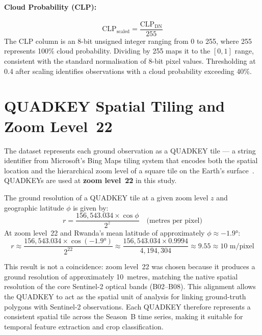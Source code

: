 \paragraph{Cloud Probability (CLP):}
\begin{equation}
\label{eq:clp_scale}
\mathrm{CLP}_{\text{scaled}} = \frac{\mathrm{CLP}_{\text{DN}}}{255}
\end{equation}
The CLP column is an 8-bit unsigned integer ranging from 0 to 255,
where 255 represents 100\% cloud probability. Dividing by 255 maps it to
the $[0,1]$ range, consistent with the standard normalisation of 8-bit
pixel values. Thresholding at 0.4 after scaling identifies observations
with a cloud probability exceeding 40\%.


\section{QUADKEY Spatial Tiling and Zoom Level~22}
\label{sec:quadkey}

The dataset represents each ground observation as a QUADKEY tile — a
string identifier from Microsoft's Bing Maps tiling system that encodes
both the spatial location and the hierarchical zoom level of a square
tile on the Earth's surface~\cite{bing2010}. QUADKEYs are used at
\textbf{zoom level~22} in this study.

The ground resolution of a QUADKEY tile at a given zoom level $z$ and
geographic latitude $\phi$ is given by:
\begin{equation}
\label{eq:ground_res}
r = \frac{156{,}543.034 \times \cos\phi}{2^{z}} \quad \text{(metres per pixel)}
\end{equation}
At zoom level~22 and Rwanda's mean latitude of approximately $\phi \approx
-1.9°$:
\begin{equation}
r \approx \frac{156{,}543.034 \times \cos(-1.9°)}{2^{22}}
  \approx \frac{156{,}543.034 \times 0.9994}{4{,}194{,}304}
  \approx 9.55 \approx 10 \text{ m/pixel}
\end{equation}

This result is not a coincidence: zoom level~22 was chosen because it
produces a ground resolution of approximately 10~metres, matching the
native spatial resolution of the core Sentinel-2 optical bands
(B02--B08). This alignment allows the QUADKEY to act as the spatial unit
of analysis for linking ground-truth polygons with Sentinel-2 observations.
Each QUADKEY therefore represents a consistent spatial tile across the
Season~B time series, making it suitable for temporal feature extraction
and crop classification.


